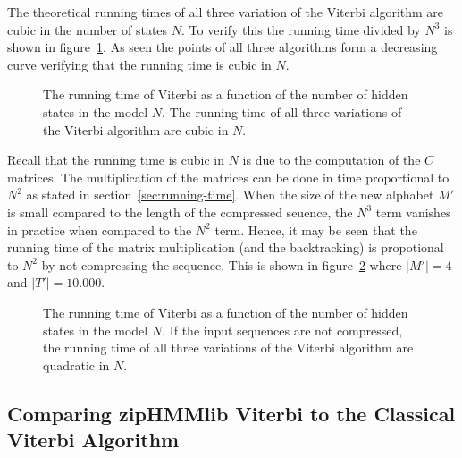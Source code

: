 The theoretical running times of all three variation of the Viterbi algorithm
are cubic in the number of states $N$. To verify this the running time divided
by $N^3$ is shown in figure~\ref{fig:assymptotic_viterbi_backtrack_N}. As seen
the points of all three algorithms form a decreasing curve verifying that the
running time is cubic in $N$.

\begin{figure}
  \centering
  
  \caption{The running time of Viterbi as a function of the number of hidden
    states in the model $N$. The running time of all three variations of the Viterbi
    algorithm are cubic in $N$.}
  \label{fig:assymptotic_viterbi_backtrack_N}
\end{figure}

Recall that the running time is cubic in $N$ is due to the computation of the
$C$ matrices. The multiplication of the matrices can be done in time
proportional to $N^2$ as stated in section~\ref{sec:running-time}. When the
size of the new alphabet $M'$ is small compared to the length of the compressed
seuence, the $N^3$ term vanishes in practice when compared to the $N^2$
term. Hence, it may be seen that the running time of the matrix multiplication
(and the backtracking) is propotional to $N^2$ by not compressing the
sequence. This is shown in figure~\ref{fig:assymptotic_viterbi_N} where
$\lvert M' \rvert = 4$ and $\lvert T' \rvert = 10.000$.

\begin{figure}
  \centering
  
  \caption{The running time of Viterbi as a function of the number of hidden
    states in the model $N$. If the input sequences are not compressed, the
    running time of all three variations of the Viterbi algorithm are quadratic
    in $N$.}
  \label{fig:assymptotic_viterbi_N}
\end{figure}


\subsection{Comparing zipHMMlib Viterbi to the Classical Viterbi Algorithm}

